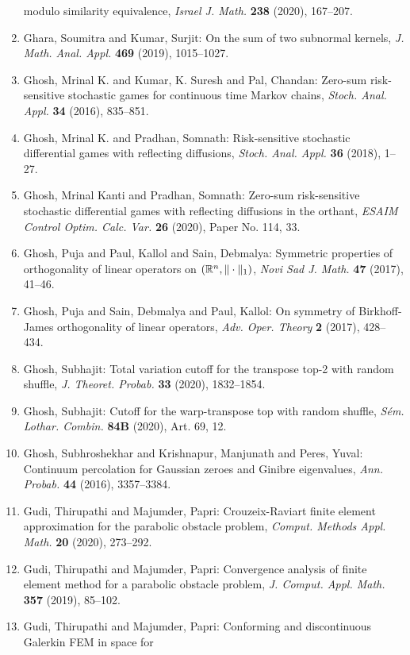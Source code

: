 \begin{enumerate}
modulo similarity equivalence, \emph{Israel J. Math.} {\bf 238} (2020), 167--207.
\item Ghara, Soumitra and Kumar, Surjit: On the sum of two subnormal kernels, \emph{J. Math. Anal. Appl.} {\bf 469} (2019), 1015--1027.
\item Ghosh, Mrinal K. and Kumar, K. Suresh and Pal, Chandan: Zero-sum risk-sensitive stochastic games for continuous time
{M}arkov chains, \emph{Stoch. Anal. Appl.} {\bf 34} (2016), 835--851.
\item Ghosh, Mrinal K. and Pradhan, Somnath: Risk-sensitive stochastic differential games with reflecting
diffusions, \emph{Stoch. Anal. Appl.} {\bf 36} (2018), 1--27.
\item Ghosh, Mrinal Kanti and Pradhan, Somnath: Zero-sum risk-sensitive stochastic differential games with
reflecting diffusions in the orthant, \emph{ESAIM Control Optim. Calc. Var.} {\bf 26} (2020), Paper No. 114, 33.
\item Ghosh, Puja and Paul, Kallol and Sain, Debmalya: Symmetric properties of orthogonality of linear operators on
{$(\Bbb R^n,\|\cdot\|_1)$}, \emph{Novi Sad J. Math.} {\bf 47} (2017), 41--46.
\item Ghosh, Puja and Sain, Debmalya and Paul, Kallol: On symmetry of {B}irkhoff-{J}ames orthogonality of linear
operators, \emph{Adv. Oper. Theory} {\bf 2} (2017), 428--434.
\item Ghosh, Subhajit: Total variation cutoff for the transpose top-2 with random
shuffle, \emph{J. Theoret. Probab.} {\bf 33} (2020), 1832--1854.
\item Ghosh, Subhajit: Cutoff for the warp-transpose top with random shuffle, \emph{S\'{e}m. Lothar. Combin.} {\bf 84B} (2020), Art. 69, 12.
\item Ghosh, Subhroshekhar and Krishnapur, Manjunath and Peres,
Yuval: Continuum percolation for {G}aussian zeroes and {G}inibre
eigenvalues, \emph{Ann. Probab.} {\bf 44} (2016), 3357--3384.
\item Gudi, Thirupathi and Majumder, Papri: Crouzeix-{R}aviart finite element approximation for the
parabolic obstacle problem, \emph{Comput. Methods Appl. Math.} {\bf 20} (2020), 273--292.
\item Gudi, Thirupathi and Majumder, Papri: Convergence analysis of finite element method for a parabolic
obstacle problem, \emph{J. Comput. Appl. Math.} {\bf 357} (2019), 85--102.
\item Gudi, Thirupathi and Majumder, Papri: Conforming and discontinuous {G}alerkin {FEM} in space for

\end{enumerate}
